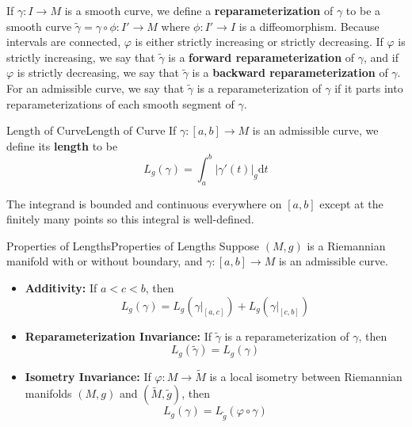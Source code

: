 \documentclass[../main.tex]{subfiles}
\begin{document}
If $\gamma: I \to M$ is a smooth curve, we define a \textbf{reparameterization} of $\gamma$ to be a smooth curve $\tilde{\gamma} = \gamma \circ \phi: I' \to M$ where $\phi: I' \to I$ is a diffeomorphism. Because intervals are connected, $\varphi$ is either strictly increasing or strictly decreasing. If $\varphi$ is strictly increasing, we say that $\tilde{\gamma}$ is a \textbf{forward reparameterization} of $\gamma$, and if $\varphi$ is strictly decreasing, we say that $\tilde{\gamma}$ is a \textbf{backward reparameterization} of $\gamma$. For an admissible curve, we say that $\tilde{\gamma}$ is a reparameterization of $\gamma$ if it parts into reparameterizations of each smooth segment of $\gamma$.

\begin{definition}{Length of Curve}{Length of Curve}
	If $\gamma: [a, b] \to M$ is an admissible curve, we define its \textbf{length} to be
	\begin{equation}
		L_g(\gamma) = \int_a^b |\gamma'(t)|_g \mathrm{d}t
	\end{equation}
\end{definition}
The integrand is bounded and continuous everywhere on $[a, b]$ except at the finitely many points so this integral is well-defined.

\begin{proposition}{Properties of Lengths}{Properties of Lengths}
	Suppose $(M, g)$ is a Riemannian manifold with or without boundary, and $\gamma: [a, b] \to M$ is an admissible curve.
	\begin{itemize}
		\item \textbf{Additivity:} If $a < c < b$, then
		  \begin{equation}
			  L_g(\gamma) = L_g(\gamma|_{[a, c]}) + L_g(\gamma|_{[c, b]})
		  \end{equation}
		\item \textbf{Reparameterization Invariance:} If $\tilde{\gamma}$ is a reparameterization of $\gamma$, then
		  \begin{equation}
			  L_g(\tilde{\gamma}) = L_g(\gamma)
		  \end{equation}
		\item \textbf{Isometry Invariance:} If $\varphi: M \to \tilde{M}$ is a local isometry between Riemannian manifolds $(M, g)$ and $(\tilde{M}, \tilde{g})$, then
		  \begin{equation}
		  	L_g(\gamma) = L_{\tilde{g}}(\varphi \circ \gamma)
		  \end{equation}
	\end{itemize}
\end{proposition}
\end{document}
